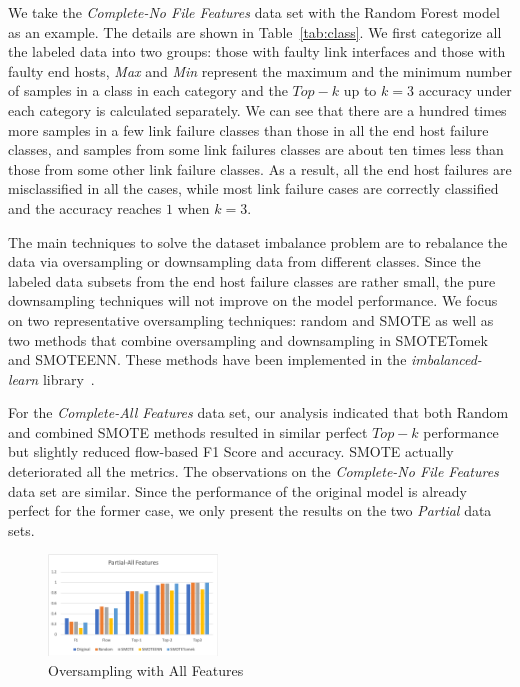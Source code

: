 We take the {\it Complete-No File Features} data set with the Random Forest model as an example. The details are shown in Table~\ref{tab:class}. We first categorize all the labeled data into two groups: those with faulty link interfaces and those with faulty end hosts, {\it Max} and {\it Min} represent the maximum and the minimum number of samples in a class in each category and the $Top-k$ up to $k=3$ accuracy under each category is calculated separately. We can see that there are a hundred times more samples in a few link failure classes than those in all the end host failure classes, and samples from some link failures classes are about ten times less than those from some other link failure classes. As a result, all the end host failures are misclassified in all the cases, while most link failure cases are correctly classified and the accuracy reaches $1$ when $k=3$.

The main techniques to solve the dataset imbalance problem are to rebalance the data via oversampling or downsampling data from different classes. Since the labeled data subsets from the end host failure classes are rather small, the pure downsampling techniques will not improve on the model performance. We focus on two representative oversampling techniques: random and SMOTE as well as two methods that combine oversampling and downsampling in SMOTETomek and SMOTEENN.
These methods have been implemented in the {\it imbalanced-learn} library~\cite{imbalance-learn:web}.

For the  {\it Complete-All Features} data set, our analysis indicated that both Random and combined SMOTE methods resulted in similar perfect $Top-k$ performance but slightly reduced flow-based F1 Score and accuracy. SMOTE actually deteriorated all the metrics. The observations on the  {\it Complete-No File Features} data set are similar. Since the performance of the original model is already perfect for the former case, we only present the results on the two {\it Partial} data sets.

\begin{figure}[!ht]
\begin{center}
\includegraphics[width=0.4\textwidth]{./figure/partial-all-oversampling}
\end{center}
\caption{Oversampling with All Features}
\label{fig:os:all}
\end{figure}

